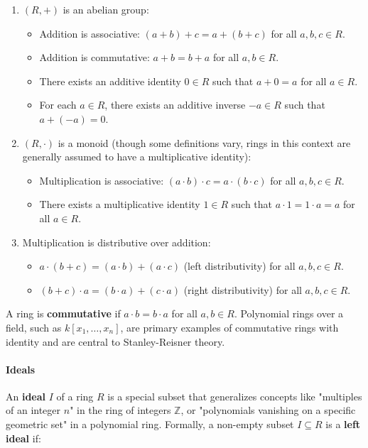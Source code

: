 \documentclass[12pt]{article}
\theoremstyle{definition}
\numberwithin{equation}{subsection}
\begin{document}
\begin{enumerate}
  \item $(R,+)$ is an abelian group:
    \begin{itemize}
      \item Addition is associative: $(a+b)+c=a+(b+c)$ for all $a,b,c\in R$.
      \item Addition is commutative: $a+b=b+a$ for all $a,b\in R$.
      \item There exists an additive identity $0\in R$ such that $a+0=a$ for all $a\in R$.
      \item For each $a\in R$, there exists an additive inverse $-a\in R$ such that $a+(-a)=0$.
    \end{itemize}
  \item $(R,\cdot)$ is a monoid (though some definitions vary, rings in this context are generally assumed to have a multiplicative identity):
    \begin{itemize}
      \item Multiplication is associative: $(a\cdot b)\cdot c=a\cdot(b\cdot c)$ for all $a,b,c\in R$.
      \item There exists a multiplicative identity $1\in R$ such that $a\cdot 1=1\cdot a=a$ for all $a\in R$.
    \end{itemize}
  \item Multiplication is distributive over addition:
    \begin{itemize}
      \item $a\cdot(b+c)=(a\cdot b)+(a\cdot c)$ (left distributivity) for all $a,b,c\in R$.
      \item $(b+c)\cdot a=(b\cdot a)+(c\cdot a)$ (right distributivity) for all $a,b,c\in R$.
    \end{itemize}
\end{enumerate}

A ring is \textbf{commutative} if $a\cdot b=b\cdot a$ for all $a,b\in R$. Polynomial rings over a field, such as $k[x_1,\ldots,x_n]$, are primary examples of commutative rings with identity and are central to Stanley-Reisner theory.

\paragraph{Ideals}
An \textbf{ideal} $I$ of a ring $R$ is a special subset that generalizes concepts like "multiples of an integer $n$" in the ring of integers $\mathbb{Z}$, or "polynomials vanishing on a specific geometric set" in a polynomial ring. Formally, a non-empty subset $I\subseteq R$ is a \textbf{left ideal} if:
\end{document}
